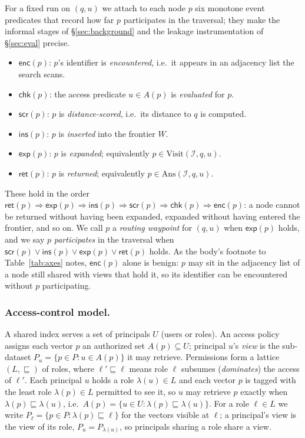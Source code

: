 \documentclass[sigconf, nonacm, review]{acmart}
\begin{document}
For a fixed run on $(q,u)$ we attach to each node $p$ six monotone event
predicates that record how far $p$ participates in the traversal; they make
the informal stages of \S\ref{sec:background} and the leakage instrumentation
of \S\ref{sec:eval} precise.
\begin{itemize}
\item $\mathsf{enc}(p)$: $p$'s identifier is \emph{encountered}, i.e.\ it
  appears in an adjacency list the search scans.
\item $\mathsf{chk}(p)$: the access predicate $u\in A(p)$ is \emph{evaluated}
  for $p$.
\item $\mathsf{scr}(p)$: $p$ is \emph{distance-scored}, i.e.\ its distance to
  $q$ is computed.
\item $\mathsf{ins}(p)$: $p$ is \emph{inserted} into the frontier $W$.
\item $\mathsf{exp}(p)$: $p$ is \emph{expanded}; equivalently
  $p\in\mathrm{Visit}(\mathcal{I},q,u)$.
\item $\mathsf{ret}(p)$: $p$ is \emph{returned}; equivalently
  $p\in\mathrm{Ans}(\mathcal{I},q,u)$.
\end{itemize}
These hold in the order
$\mathsf{ret}(p)\Rightarrow\mathsf{exp}(p)\Rightarrow\mathsf{ins}(p)
\Rightarrow\mathsf{scr}(p)\Rightarrow\mathsf{chk}(p)\Rightarrow\mathsf{enc}(p)$:
a node cannot be returned without having been expanded, expanded without
having entered the frontier, and so on. We call $p$ a \emph{routing waypoint}
for $(q,u)$ when $\mathsf{exp}(p)$ holds, and we say $p$ \emph{participates} in
the traversal when $\mathsf{scr}(p)\lor\mathsf{ins}(p)\lor\mathsf{exp}(p)
\lor\mathsf{ret}(p)$ holds. As the body's footnote to Table~\ref{tab:axes}
notes, $\mathsf{enc}(p)$ alone is benign: $p$ may sit in the adjacency list of
a node still shared with views that hold it, so its identifier can be
encountered without $p$ participating.

\subsubsection{Access-control model.}
\label{app:access}
A shared index serves a set of principals $U$ (users or roles). An access
policy assigns each vector $p$ an authorized set $A(p)\subseteq U$; principal
$u$'s \emph{view} is the sub-dataset $P_u=\{p\in P:u\in A(p)\}$ it may
retrieve. Permissions form a lattice $(L,\sqsubseteq)$ of roles, where
$\ell'\sqsubseteq\ell$ means role $\ell$ subsumes (\emph{dominates}) the access
of $\ell'$. Each principal $u$ holds a role $\lambda(u)\in L$ and each vector
$p$ is tagged with the least role $\lambda(p)\in L$ permitted to see it, so
$u$ may retrieve $p$ exactly when $\lambda(p)\sqsubseteq\lambda(u)$, i.e.\
$A(p)=\{u\in U:\lambda(p)\sqsubseteq\lambda(u)\}$. For a role $\ell\in L$ we
write $P_\ell=\{p\in P:\lambda(p)\sqsubseteq\ell\}$ for the vectors visible at
$\ell$; a principal's view is the view of its role, $P_u=P_{\lambda(u)}$, so
principals sharing a role share a view.
\end{document}
